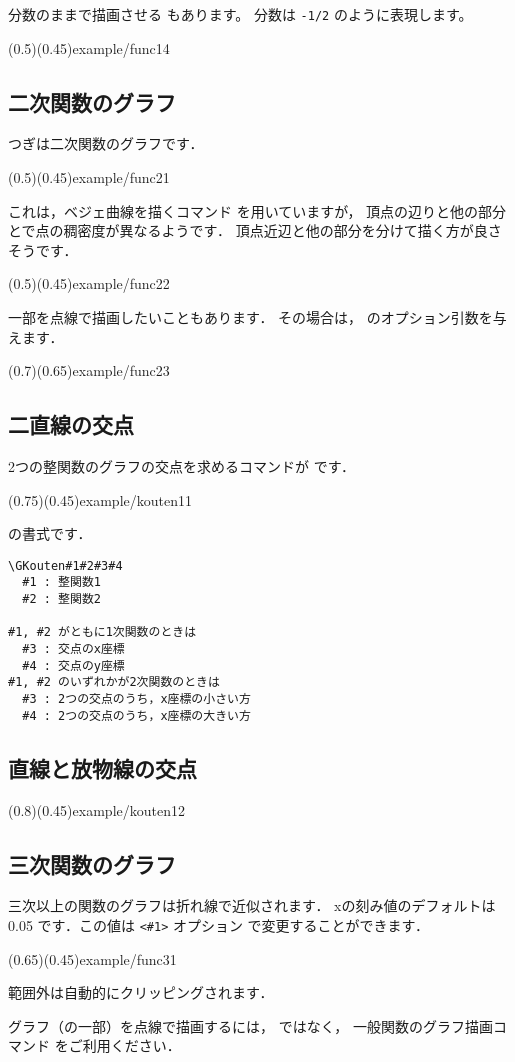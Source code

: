 分数のままで描画させる  もあります。
分数は \verb+-1/2+ のように表現します。

\showexample(0.5)(0.45){example/func14}

\subsection{二次関数のグラフ}
つぎは二次関数のグラフです．

\showexample[二次関数のグラフ](0.5)(0.45){example/func21}

これは，ベジェ曲線を描くコマンド  を用いていますが，
頂点の辺りと他の部分とで点の稠密度が異なるようです．
頂点近辺と他の部分を分けて描く方が良さそうです．

\showexample[二次関数のグラフ(2)](0.5)(0.45){example/func22}

一部を点線で描画したいこともあります．
その場合は， のオプション引数を与えます．

\showexample[一部を点線で](0.7)(0.65){example/func23}

\subsection{二直線の交点}
2つの整関数のグラフの交点を求めるコマンドが  です．

\showexample[二直線の交点](0.75)(0.45){example/kouten11}

 の書式です．

\begin{boxnote}
\begin{verbatim}
\GKouten#1#2#3#4
  #1 : 整関数1
  #2 : 整関数2

#1, #2 がともに1次関数のときは
  #3 : 交点のx座標
  #4 : 交点のy座標
#1, #2 のいずれかが2次関数のときは
  #3 : 2つの交点のうち，x座標の小さい方
  #4 : 2つの交点のうち，x座標の大きい方
\end{verbatim}
\end{boxnote}

\subsection{直線と放物線の交点}

\showexample[直線と放物線の交点](0.8)(0.45){example/kouten12}

\subsection{三次関数のグラフ}
三次以上の関数のグラフは折れ線で近似されます．
xの刻み値のデフォルトは 0.05 です．この値は \verb+<#1>+ オプション
で変更することができます．

\showexample[三次関数のグラフ](0.65)(0.45){example/func31}

範囲外は自動的にクリッピングされます．

グラフ（の一部）を点線で描画するには， ではなく，
一般関数のグラフ描画コマンド  をご利用ください．
